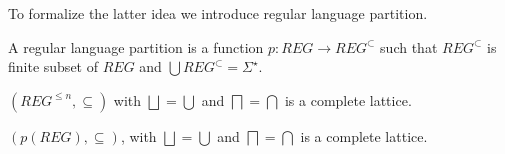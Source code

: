 To formalize the latter idea we introduce regular language partition.

\begin{definition}
    A regular language partition is a function $p : REG \rightarrow REG^\subset$ such that $REG^\subset$ is finite subset of $REG$ and $\bigcup REG^\subset = \Sigma^\star$.
\end{definition}

\begin{theorem}\label{thm:finite-reg-lattice}
    $(REG^{\leq n}, \subseteq)$ with $\bigsqcup = \bigcup$ and $\bigsqcap = \bigcap$ is a complete lattice.
\end{theorem}

\begin{theorem}\label{thm:reg-partition-lattice}
    $(p(REG), \subseteq)$, with $\bigsqcup = \bigcup$ and $\bigsqcap = \bigcap$ is a complete lattice.
\end{theorem}
